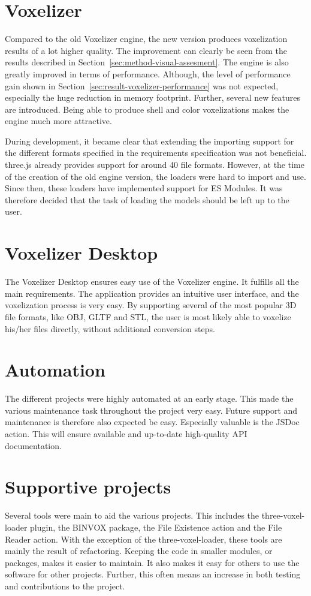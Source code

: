 \section{Voxelizer}
\label{sec:discussion-voxelizer}
Compared to the old Voxelizer engine, the new version produces voxelization results of a lot higher quality. The improvement can clearly be seen from the results described in Section~\ref{sec:method-visual-assesment}. The engine is also greatly improved in terms of performance. Although, the level of performance gain shown in Section~\ref{sec:result-voxelizer-performance} was not expected, especially the huge reduction in memory footprint. Further, several new features are introduced. Being able to produce shell and color voxelizations makes the engine much more attractive.

During development, it became clear that extending the importing support for the different formats specified in the requirements specification was not beneficial. three.js already provides support for around 40 file formats. However, at the time of the creation of the old engine version, the loaders were hard to import and use. Since then, these loaders have implemented support for ES Modules. It was therefore decided that the task of loading the models should be left up to the user.

\section{Voxelizer Desktop}
\label{sec:discussion-voxelizer-desktop}
The Voxelizer Desktop ensures easy use of the Voxelizer engine. It fulfills all the main requirements. The application provides an intuitive user interface, and the voxelization process is very easy. By supporting several of the most popular 3D file formats, like OBJ, GLTF and STL, the user is most likely able to voxelize his/her files directly, without additional conversion steps.

\section{Automation}
\label{sec:discussion-automation}
The different projects were highly automated at an early stage. This made the various maintenance task throughout the project very easy. Future support and maintenance is therefore also expected be easy. Especially valuable is the JSDoc action. This will ensure available and up-to-date high-quality API documentation.

\section{Supportive projects}
\label{sec:discussion-supportive-projects}
Several tools were main to aid the various projects. This includes the three-voxel-loader plugin, the BINVOX package, the File Existence action and the File Reader action. With the exception of the three-voxel-loader, these tools are mainly the result of refactoring. Keeping the code in smaller modules, or packages, makes it easier to maintain. It also makes it easy for others to use the software for other projects. Further, this often means an increase in both testing and contributions to the project.

